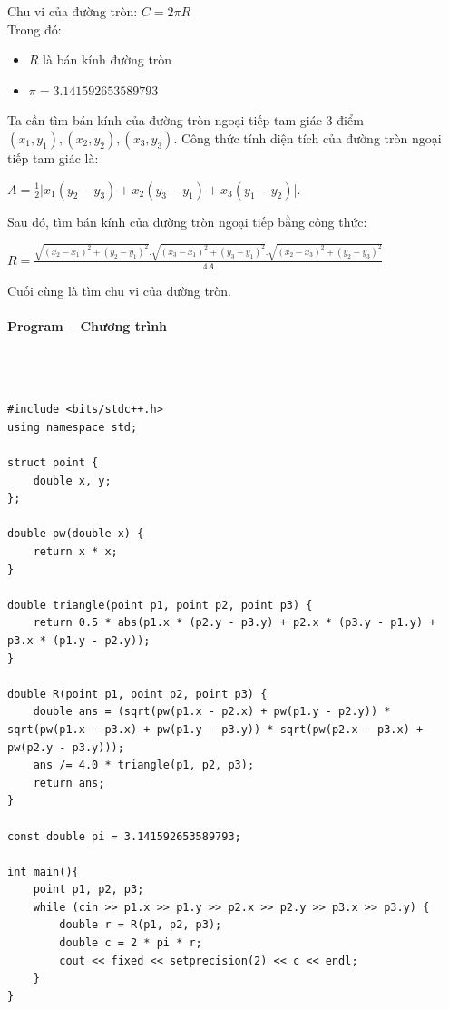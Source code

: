 \documentclass{article}
\begin{document}
Chu vi của đường tròn: $C = 2 \pi R$\\
Trong đó:
\begin{itemize}
    \item $R$ là bán kính đường tròn
    \item $\pi = 3.141592653589793$ 
\end{itemize}

Ta cần tìm bán kính của đường tròn ngoại tiếp tam giác 3 điểm $(x_1,y_1), (x_2,y_2), (x_3,y_3)$. Công thức tính diện tích của đường tròn ngoại tiếp tam giác là: \\

\begin{center}
    $A = \frac{1}{2}|x_1(y_2-y_3) + x_2(y_3-y_1) + x_3(y_1-y_2)$|.    
\end{center}

Sau đó, tìm bán kính của đường tròn ngoại tiếp bằng công thức:

\begin{center}
    $R = \frac{\sqrt{(x_2-x_1)^2 +(y_2-y_1)^2}.\sqrt{(x_3-x_1)^2+(y_3-y_1)^2}.\sqrt{(x_2-x_3)^2+(y_2-y_3)^2}}{4A}$
\end{center}

Cuối cùng là tìm chu vi của đường tròn.

\paragraph{Program -- Chương trình} \mbox{} \\


\begin{lstlisting}

#include <bits/stdc++.h>
using namespace std;

struct point {
	double x, y;
};

double pw(double x) {
	return x * x;
}

double triangle(point p1, point p2, point p3) {
	return 0.5 * abs(p1.x * (p2.y - p3.y) + p2.x * (p3.y - p1.y) + p3.x * (p1.y - p2.y));
}

double R(point p1, point p2, point p3) {
	double ans = (sqrt(pw(p1.x - p2.x) + pw(p1.y - p2.y)) * sqrt(pw(p1.x - p3.x) + pw(p1.y - p3.y)) * sqrt(pw(p2.x - p3.x) + pw(p2.y - p3.y)));
	ans /= 4.0 * triangle(p1, p2, p3);
	return ans;
}

const double pi = 3.141592653589793;

int main(){
	point p1, p2, p3;
	while (cin >> p1.x >> p1.y >> p2.x >> p2.y >> p3.x >> p3.y) {
		double r = R(p1, p2, p3);
		double c = 2 * pi * r;
		cout << fixed << setprecision(2) << c << endl;
	}
}

\end{lstlisting}
\end{document}
